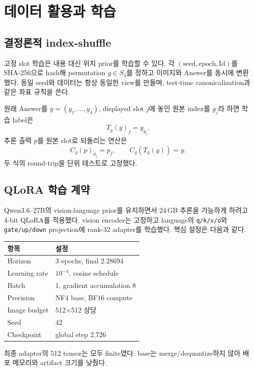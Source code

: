 \documentclass[9pt,a4paper]{extarticle}
\newcommand{\code}[1]{\texttt{\footnotesize #1}}
\begin{document}
\section{데이터 활용과 학습}
\begin{multicols}{2}

\subsection{결정론적 index-shuffle}

고정 slot 학습은 내용 대신 위치 prior를 학습할 수 있다. 각
$(\text{seed},\text{epoch},\text{Id})$를 SHA-256으로 hash해 permutation
$g\in S_4$를 정하고 이미지와 Answer를 동시에 변환했다. 동일 seed와 데이터는
항상 동일한 view를 만들며, test-time canonicalization과 같은 좌표 규칙을 쓴다.

원래 Answer를 $y=(y_1,\ldots,y_4)$, displayed slot $j$에 놓인 원본 index를
$g_j$라 하면 학습 label은
\[
  T_g(y)_j = y_{g_j}.
\]
추론 출력 $p$를 원본 slot로 되돌리는 연산은
\[
  C_g(p)_{g_j}=p_j,\qquad C_g(T_g(y))=y.
\]
두 식의 round-trip을 단위 테스트로 고정했다.

\subsection{QLoRA 학습 계약}

Qwen3.6--27B의 vision-language prior를 유지하면서 24\,GB 추론을 가능하게 하려고
4-bit QLoRA를 적용했다. vision encoder는 고정하고 language의
\code{q/k/v/o}와 \code{gate/up/down} projection에 rank-32 adapter를
학습했다. 핵심 설정은 다음과 같다.

\begin{tabularx}{\linewidth}{@{}lY@{}}
\toprule
항목 & 설정\\
\midrule
Horizon & 3 epochs, final 2.28694\\
Learning rate & $10^{-4}$, cosine schedule\\
Batch & 1, gradient accumulation 8\\
Precision & NF4 base, BF16 compute\\
Image budget & 512$\times$512 상당\\
Seed & 42\\
Checkpoint & global step 2,726\\
\bottomrule
\end{tabularx}

최종 adapter의 512 tensor는 모두 finite였다. base는 merge/dequantize하지 않아
배포 메모리와 artifact 크기를 낮췄다.


\end{multicols}
\end{document}
